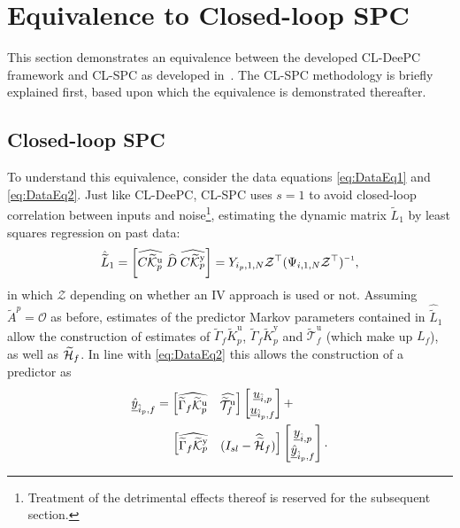 \section{Equivalence to Closed-loop \acs{SPC}}
This section demonstrates an equivalence between the developed \ac{CL-DeePC} framework and \ac{CL-SPC} as developed in~\cite{Dong2008}. The \ac{CL-SPC} methodology is briefly explained first, based upon which the equivalence is demonstrated thereafter.

\subsection{Closed-loop \ac{SPC}}
To understand this equivalence, consider the data equations \eqref{eq:DataEq1} and \eqref{eq:DataEq2}. Just like \ac{CL-DeePC}, \ac{CL-SPC} uses $s=1$ to avoid closed-loop correlation between inputs and noise\footnote{Treatment of the detrimental effects thereof is reserved for the subsequent section.}, estimating the dynamic matrix $\widetilde{L}_1$ by least squares regression on past data:
\begin{align}\label{eq:CL-SPC-PredMarkov}
\hat{\widetilde{L}}_1 = \left[ \widehat{C\tKp{u}} \; \widehat{D} \; \widehat{C\tKp{y}} \right]=Y_{i_p,1,N}\mathcal{Z}^\top (\Psi_{i,1,N}\mathcal{Z}^\top)\inv,
\end{align}
in which $\mathcal{Z}$ depending on whether an \ac{IV} approach is used or not. Assuming  $\widetilde{A}^p=\mathcal{O}$ as before, estimates of the predictor Markov parameters contained in $\hat{\widetilde{L}}_1$ allow the construction of estimates of $\widetilde{\Gamma}_f\widetilde{K}_p^\mathrm{u}$, $\widetilde{\Gamma}_f\widetilde{K}_p^\mathrm{y}$ and $\widetilde{\mathcal{T}}_f^\mathrm{u}$ (which make up $L_f$), as well as $\widetilde{\mathcal{H}}_f$. In line with \eqref{eq:DataEq2} this allows the construction of a predictor as
\begin{align}\label{eq:CL-SPC-pred1}
	\begin{split}
	\underline{\hat{y}}_{\hat{i}_p,f}&= \begin{bmatrix}\widehat{\widetilde{\Gamma}_f\widetilde{\mathcal{K}}_{p}^{\mathrm{{u}}}} & \widehat{\widetilde{\mathcal{T}}_f^\mathrm{u}} \end{bmatrix} 
	\begin{bmatrix}
		\underline{u}_{\hat{i},p}\\
		\underline{u}_{\hat{i}_p,f}
	\end{bmatrix}+\\
	&\phantom{=}\mkern8mu\begin{bmatrix}
		\widehat{\widetilde{\Gamma}_f\widetilde{\mathcal{K}}_{p}^{\mathrm{{y}}}} & (I_{sl}-\widehat{\widetilde{\mathcal{H}}}_f) \end{bmatrix} 
	\begin{bmatrix}
		\underline{y}_{\hat{i},p}\\
		\underline{\hat{y}}_{\hat{i}_p,f}
	\end{bmatrix}.
	\end{split}
\end{align}

